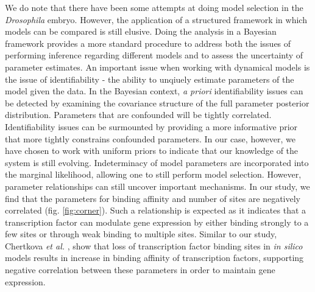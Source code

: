 We do note that there have been some attempts \cite{odell00} at doing model selection in the \textit{Drosophila} embryo. However, the application of a structured framework in which models can be compared is still elusive. Doing the analysis in a Bayesian framework provides a more standard procedure to address both the issues of performing inference regarding different models and to assess the uncertainty of parameter estimates. An important issue when working with dynamical models is the issue of identifiability \cite{Raue14, Oana11, Villaverde16, Becker13} - the ability to unqiuely estimate parameters of the model given the data. In the Bayesian context, \textit{a priori} identifiability issues can be detected by examining the covariance structure of the full parameter posterior distribution. Parameters that are confounded will be tightly correlated. Identifiability issues can be surmounted by providing a more informative prior that more tightly constrains confounded parameters. In our case, however, we have chosen to work with uniform priors to indicate that our knowledge of the system is still evolving. Indeterminacy of model parameters are incorporated into the marginal likelihood, allowing one to still perform model selection. However, parameter relationships can still uncover important mechanisms. In our study, we find that the parameters for binding affinity and number of sites are negatively correlated (fig. \ref{fig:corner}). Such a relationship is expected as it indicates that a transcription factor can modulate gene expression by either binding strongly to a few sites or through weak binding to multiple sites. Similar to our study, Chertkova \emph{et al.} \cite{Chertkova2017}, show that loss of transcription factor binding sites in \emph{in silico} models results in increase in binding affinity of transcription factors, supporting negative correlation between these parameters in order to maintain gene expression. 

